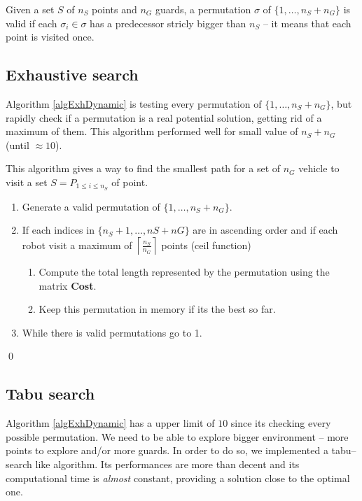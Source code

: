 \begin{criteria}
 Given a set $S$ of $n_S$ points and $n_G$ guards, a permutation $\sigma$ of $\{1,\hdots,n_S+n_G\}$ is valid if each $\sigma_i \in \sigma$ has a predecessor stricly bigger than $n_S$  -- it means that each point is visited once.
 \label{permCriteria}
\end{criteria}


\subsection{Exhaustive search}

Algorithm \ref{algExhDynamic} is testing every permutation of $\{1,\hdots,n_{S}+n_{G}\}$, but rapidly check if a permutation is a real potential solution, getting rid of a maximum of them. This algorithm performed well for small value of $n_S + n_G$ (until $\approx 10$).

\begin{algorithm}
This algorithm gives a way to find the smallest path for a set of $n_{G}$ vehicle to visit a set $S = P_{1\leq i \leq n_S}$ of point.
\begin{enumerate}[topsep=0pt,itemsep=0ex,partopsep=1ex,parsep=1ex]
  \item Generate a valid permutation of $\{1,\hdots,n_{S}+n_{G}\}$.
  \item If each indices in $\{n_S +1, \hdots , nS +nG\}$ are in ascending order and if each robot visit a maximum of $\left \lceil{\frac{n_S}{n_G}}\right \rceil$  points (ceil function)
	\begin{enumerate}[topsep=0pt,itemsep=0ex,partopsep=1ex,parsep=1ex]
  \item Compute the total length represented by the permutation using the matrix \textbf{Cost}.
  \item Keep this permutation in memory if its the best so far.
  \end{enumerate}
\item While there is valid permutations go to 1.
\end{enumerate}
\qed
\label{algExhDynamic}
\end{algorithm}


\subsection{Tabu search}

Algorithm \ref{algExhDynamic} has a upper limit of $10$ since its checking every possible permutation. We need to be able to explore bigger environment -- more points to explore and/or more guards. In order to do so, we implemented a tabu--search like algorithm. Its performances are more than decent and its computational time is \emph{almost} constant, providing a solution close to the optimal one.

